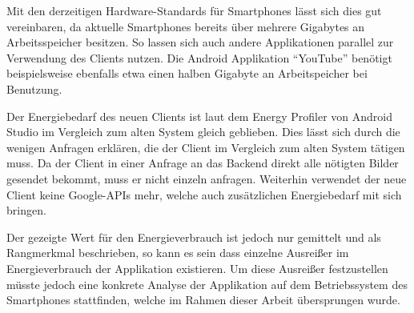 Mit den derzeitigen Hardware-Standards für Smartphones lässt sich dies gut vereinbaren, da aktuelle Smartphones bereits über mehrere Gigabytes an Arbeitsspeicher besitzen.
So lassen sich auch andere Applikationen parallel zur Verwendung des Clients nutzen.
Die Android Applikation "`YouTube"' benötigt beispielsweise ebenfalls etwa einen halben Gigabyte an Arbeitspeicher bei Benutzung.

Der Energiebedarf des neuen Clients ist laut dem Energy Profiler von Android Studio im Vergleich zum alten System gleich geblieben.
Dies lässt sich durch die wenigen Anfragen erklären, die der Client im Vergleich zum alten System tätigen muss.
Da der Client in einer Anfrage an das Backend direkt alle nötigten Bilder gesendet bekommt, muss er nicht einzeln anfragen.
Weiterhin verwendet der neue Client keine Google-APIs mehr, welche auch zusätzlichen Energiebedarf mit sich bringen.

Der gezeigte Wert für den Energieverbrauch ist jedoch nur gemittelt und als Rangmerkmal beschrieben, so kann es sein dass einzelne Ausreißer im Energieverbrauch der Applikation existieren. Um diese Ausreißer festzustellen müsste jedoch eine konkrete Analyse der Applikation auf dem Betriebssystem des Smartphones stattfinden, welche im Rahmen dieser Arbeit übersprungen wurde.
